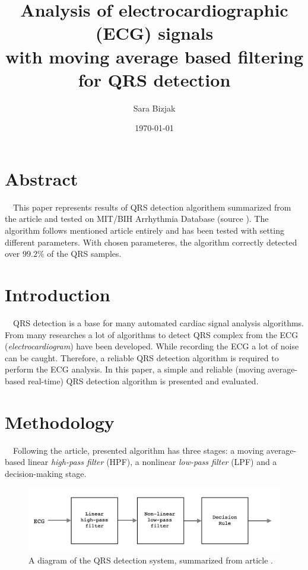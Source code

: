 \documentclass[a4paper,11pt]{article}
\title{Analysis of electrocardiographic (ECG) signals \\
with moving average based filtering for QRS detection}
\author{Sara Bizjak}
\date{\today}
\begin{document}
\maketitle

\section{Abstract}

\ \ This paper represents results of QRS detection algorithem summarized from the article \cite{bib:glavni} and tested on MIT/BIH Arrhythmia Database (source \cite{bib:net}).
The algorithm follows mentioned article entirely and has been tested with setting different parameters.
With chosen parameteres, the algorithm correctly detected over $99.2 \%$ of the QRS samples.

\section{Introduction}

\ \ QRS detection is a base for many automated cardiac signal analysis algorithms.
From many researches a lot of algorithms to detect QRS complex from the ECG (\textit{electrocardiogram}) have been developed.
While recording the ECG a lot of noise can be caught. Therefore, a reliable QRS detection algorithm is required to perform the ECG analysis.
In this paper, a simple and reliable (moving average-based real-time) QRS detection algorithm is presented and evaluated.

\section{Methodology}

\ \ Following the article, presented algorithm has three stages: a moving average-based linear \textit{high-pass filter} (HPF), a nonlinear \textit{low-pass filter} (LPF) and a decision-making stage.

\begin{figure}[ht!]
    \centering
    \includegraphics[width=130mm]{diagram.png}
    \caption{A diagram of the QRS detection system, summarized from article \cite{bib:glavni}.}
\end{figure}
\end{document}
